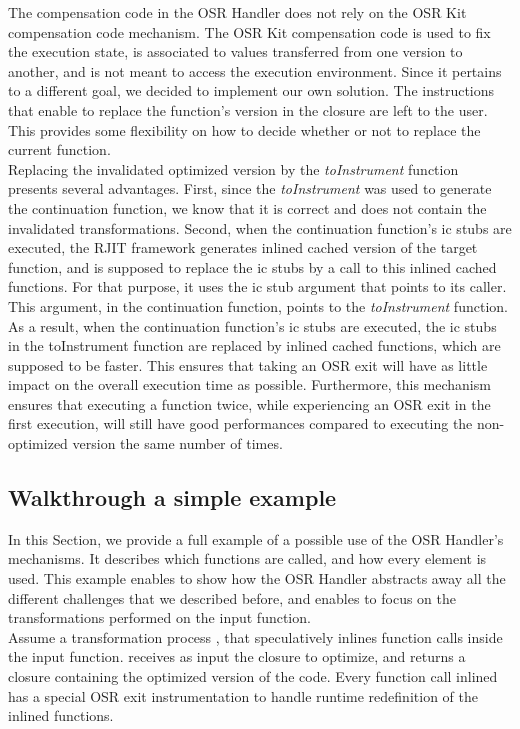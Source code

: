 The compensation code in the OSR Handler does not rely on the OSR Kit compensation code mechanism.
The OSR Kit compensation code is used to fix the execution state, is associated to values transferred from one version to another, and is not meant to access the execution environment.
Since it pertains to a different goal, we decided to implement our own solution.
The instructions that enable to replace the function's version in the closure are left to the user. 
This provides some flexibility on how to decide whether or not to replace the current function.\\

Replacing the invalidated optimized version by the \textit{toInstrument} function presents several advantages.
First, since the \textit{toInstrument} was used to generate the continuation function, we know that it is correct and does not contain the invalidated transformations.
Second, when the continuation function's ic stubs are executed, the RJIT framework generates inlined cached version of the target function, and is supposed to replace the ic stubs by a call to this inlined cached functions.
For that purpose, it uses the ic stub argument that points to its caller.
This argument, in the continuation function, points to the \textit{toInstrument} function.
As a result, when the continuation function's ic stubs are executed, the ic stubs in the toInstrument function are replaced by inlined cached functions, which are supposed to be faster.
This ensures that taking an OSR exit will have as little impact on the overall execution time as possible.
Furthermore, this mechanism ensures that executing a function twice, while experiencing an OSR exit in the first execution, will still have good performances compared to executing the non-optimized version the same number of times.\\

\subsection{Walkthrough a simple example}
In this Section, we provide a full example of a possible use of the OSR Handler's mechanisms.
It describes which functions are called, and how every element is used.
This example enables to show how the OSR Handler abstracts away all the different challenges that we described before, and enables to focus on the transformations performed on the input function.\\

Assume a transformation process , that speculatively inlines function calls inside the input function. 
 receives as input the closure to optimize, and returns a closure containing the optimized version of the code.
Every function call inlined has a special OSR exit instrumentation to handle runtime redefinition of the inlined functions.\\

